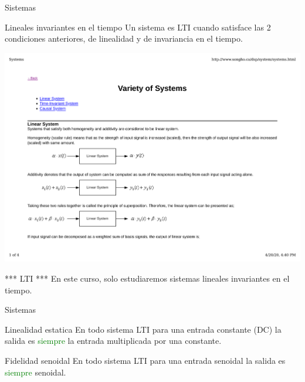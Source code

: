  \begin{frame}{Sistemas}{}
    \begin{block}{Lineales invariantes en el tiempo}
       Un sistema es LTI cuando satisface las 2 condiciones anteriores, de linealidad y de invariancia en el tiempo.
    \end{block}
    \center\includegraphics[width=1\textwidth]{1_clase/lti}
    \vfill
    \begin{alertblock}{*** LTI ***}
       En este curso, \alert{solo} estudiaremos sistemas lineales invariantes en el tiempo.
    \end{alertblock}
 \end{frame}
 \begin{frame}{Sistemas}{}
    \begin{block}{Linealidad estatica}
       En todo sistema LTI para una entrada constante (DC) la salida es \textcolor{green}{siempre} la entrada multiplicada por una constante.
    \end{block}
    \begin{block}{Fidelidad senoidal}
       En todo sistema LTI para una entrada senoidal la salida es \textcolor{green}{siempre} senoidal.
    \end{block}
    \vfill
 \end{frame}
